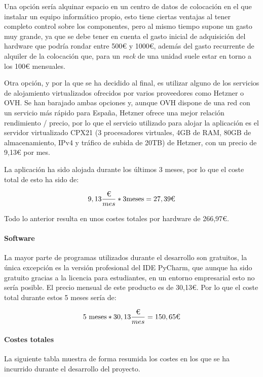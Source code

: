 Una opción sería alquinar espacio en un centro de datos de colocación en el que
instalar un equipo informático propio, esto tiene ciertas ventajas al tener
completo control sobre los componentes, pero al mismo tiempo supone un gasto muy
grande, ya que se debe tener en cuenta el gasto inicial de adquisición del
hardware que podría rondar entre 500€ y 1000€, además del gasto recurrente de
alquiler de la colocación que, para un \textit{rack} de una unidad suele estar
en torno a los 100€ mensuales.

Otra opción, y por la que se ha decidido al final, es utilizar alguno de los
servicios de alojamiento virtualizados ofrecidos por varios proveedores como
Hetzner o OVH. Se han barajado ambas opciones y, aunque OVH dispone de una red
con un servicio más rápido para España, Hetzner ofrece una mejor relación
rendimiento / precio, por lo que el servicio utilizado para alojar la aplicación
es el servidor virtualizado CPX21 (3 procesadores virtuales, 4GB de RAM, 80GB de
almacenamiento, IPv4 y tráfico de subida de 20TB) de Hetzner, con un precio de
9,13€ por mes.

La aplicación ha sido alojada durante los últimos 3 meses, por lo que el coste
total de esto ha sido de:

$$
9,13 \frac{\textup{€}}{mes} * 3 \text{meses} = 27,39\textup{€}
$$

Todo lo anterior resulta en unos costes totales por hardware de 266,97€.

\paragraph{Software}

La mayor parte de programas utilizados durante el desarrollo son gratuitos, la
única excepción es la versión profesional del IDE PyCharm, que aunque ha sido
gratuito gracias a la licencia para estudiantes, en un entorno empresarial esto
no sería posible. El precio mensual de este producto es de 30,13€. Por lo que el
coste total durante estos 5 meses sería de:

$$
5\text{ meses} * 30,13 \frac{\textup{€}}{mes} = 150,65\textup{€}
$$

\paragraph{Costes totales}

La siguiente tabla muestra de forma resumida los costes en los que se ha
incurrido durante el desarrollo del proyecto.

